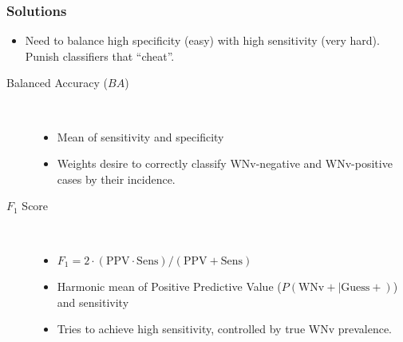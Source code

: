 \documentclass[handout]{beamer}
\begin{document}
\begin{frame}
\frametitle{Solutions}
\begin{itemize}
\item Need to balance high specificity (easy) with high sensitivity (very hard). Punish classifiers that ``cheat''.
\end{itemize}

\begin{description}
\item[Balanced Accuracy ($BA$)] \
\begin{itemize}
\item Mean of sensitivity and specificity
\item Weights desire to correctly classify WNv-negative and WNv-positive cases by their incidence.
\end{itemize}

\item[$F_1$ Score] \
\begin{itemize}
\item $F_1 = 2 \cdot \left( \mathrm{PPV} \cdot \mathrm{Sens} \right) / \left( \mathrm{PPV} + \mathrm{Sens}\right)$
\item Harmonic mean of Positive Predictive Value ($P(\text{WNv}+ | \text{Guess}+)$) and sensitivity
\item Tries to achieve high sensitivity, controlled by true WNv prevalence.
\end{itemize}
\end{description}
\end{frame}
\end{document}
